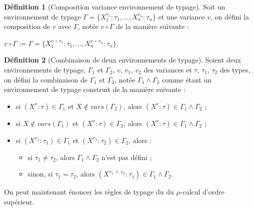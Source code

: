 \documentclass{rapport}
\theoremstyle{plain}
\theoremstyle{remark}
\theoremstyle{definition}
\newtheorem{dfn}{Définition}
\begin{document}
\begin{dfn} [Composition variance environnement de typage] Soit un environnement de typage ${\Gamma = \{X_1^{v_1} : \tau_1, \ldots, X_n^{v_n} : \tau_n\}}$ et une variance $v$, on défini la composition de $v$ avec $\Gamma$, notée ${v \circ \Gamma}$ de la manière suivante : 
\begin{center}
${v \circ \Gamma} := {\Gamma = \{X_1^{v \, \circ \, v_1} : \tau_1, \ldots, X_n^{v \, \circ \, v_n} : \tau_n\}}$.
\end{center}
\end{dfn}

\begin{dfn} [Combinaison de deux environnements de typage] Soient deux environnements de typage, $\Gamma_1$ et $\Gamma_2$, $v$, $v_1$, $v_2$ des variances et $\tau$, $\tau_1$, $\tau_2$ des types, on défini la combinaison de $\Gamma_1$ et $\Gamma_2$, notée ${\Gamma_1 \wedge \Gamma_2}$ comme étant un environnement de typage construit de la manière suivante : 
\begin{itemize}
	\item si $(X^v : \tau) \in \Gamma_1$ et $X \notin vars(\Gamma_2)$, alors $(X^v : \tau) \in {\Gamma_1 \wedge \Gamma_2}$ ;
	\item si $X \notin vars(\Gamma_1)$ et $(X^v : \tau) \in \Gamma_2$, alors $(X^v : \tau) \in {\Gamma_1 \wedge \Gamma_2}$ ;
	\item si $(X^{v_1} : \tau_1) \in \Gamma_1$ et $(X^{v_2} : \tau_2) \in \Gamma_2$, alors : 
	\begin{itemize}
		\item si $\tau_1 \neq \tau_2$, alors ${\Gamma_1 \wedge \Gamma_2}$ n'est pas défini ;
		\item sinon, si $\tau_1 = \tau_2$, alors $(X^{v_1 \, \wedge \, v_2} : \tau_1) \in {\Gamma_1 \wedge \Gamma_2}$.
	\end{itemize}
\end{itemize}
\end{dfn}

On peut maintenant énoncer les règles de typage du du $\mu$-calcul d'ordre supérieur.
\end{document}
